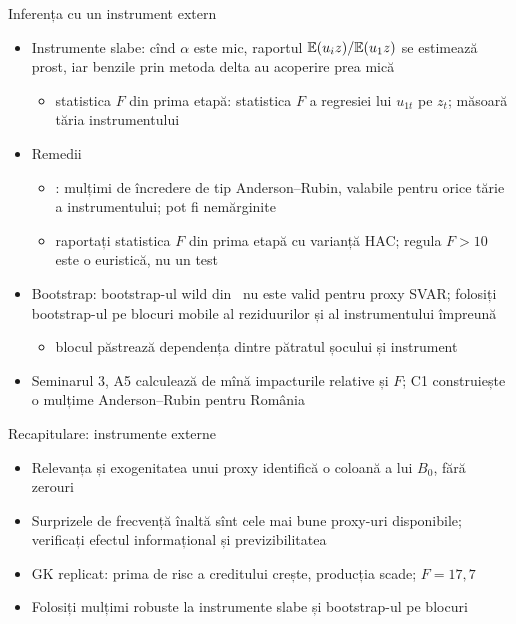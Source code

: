 \begin{frame}{Inferența cu un instrument extern}
\itemsize{\small}
\begin{itemize}
    \item Instrumente slabe: cînd $\alpha$ este mic, raportul $\mathbb{E}(u_iz)/\mathbb{E}(u_1z)$ se estimează prost, iar benzile prin metoda delta au acoperire prea mică
    \begin{itemize}
        \item statistica $F$ din prima etapă: statistica $F$ a regresiei lui $u_{1t}$ pe $z_t$; măsoară tăria instrumentului
    \end{itemize}
    \item Remedii
    \begin{itemize}
        \item {}: mulțimi de încredere de tip Anderson--Rubin, valabile pentru orice tărie a instrumentului; pot fi nemărginite
        \item raportați statistica $F$ din prima etapă cu varianță HAC; regula $F > 10$ este o euristică, nu un test
    \end{itemize}
    \item Bootstrap: bootstrap-ul wild din \ nu este valid pentru proxy SVAR; folosiți bootstrap-ul pe blocuri mobile al reziduurilor și al instrumentului împreună 
    \begin{itemize}
        \item blocul păstrează dependența dintre pătratul șocului și instrument
    \end{itemize}
    \item Seminarul 3, A5 calculează de mînă impacturile relative și $F$; C1 construiește o mulțime Anderson--Rubin pentru România
\end{itemize}
\end{frame}

\begin{frame}{Recapitulare: instrumente externe}
\itemsize{\small}
\begin{itemize}
    \item Relevanța și exogenitatea unui proxy identifică o coloană a lui $B_0$, fără zerouri
    \item Surprizele de frecvență înaltă sînt cele mai bune proxy-uri disponibile; verificați efectul informațional și previzibilitatea
    \item GK replicat: prima de risc a creditului crește, producția scade; $F = 17{,}7$
    \item Folosiți mulțimi robuste la instrumente slabe și bootstrap-ul pe blocuri
\end{itemize}
\end{frame}


